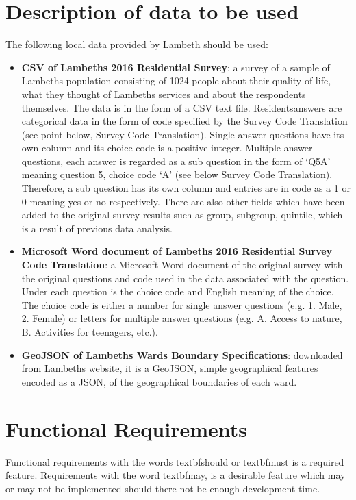 \section{Description of data to be used}
The following local data provided by Lambeth should be used:
\begin{itemize}
  \item \textbf{CSV of Lambeth\textquotesingle s 2016 Residential Survey}: a survey of a sample of Lambeth\textquotesingle s population consisting of 1024 people about their quality of life, what they thought of Lambeth\textquotesingle s services and about the respondents themselves. The data is in the form of a CSV text file. Residents\textquotesingle  answers are categorical data in the form of code specified by the Survey Code Translation (see point below, Survey Code Translation). Single answer questions have its own column and its choice code is a positive integer. Multiple answer questions, each answer is regarded as a sub question in the form of `Q5A' meaning question 5, choice code `A' (see below Survey Code Translation). Therefore, a sub question has its own column and entries are in code as a 1 or 0 meaning yes or no respectively. There are also other fields which have been added to the original survey results such as group, subgroup, quintile, which is a result of previous data analysis.
  \item \textbf{Microsoft Word document of Lambeth\textquotesingle s 2016 Residential Survey Code Translation}: a Microsoft Word document of the original survey with the original questions and code used in the data associated with the question. Under each question is the choice code and English meaning of the choice. The choice code is either a number for single answer questions (e.g. 1. Male, 2. Female) or letters for multiple answer questions (e.g. A. Access to nature, B. Activities for teenagers, etc.).
  \item \textbf{GeoJSON of Lambeth\textquotesingle s Ward\textquotesingle s Boundary Specifications}: downloaded from Lambeth\textquotesingle s website, it is a GeoJSON, simple geographical features encoded as a JSON, of the geographical boundaries of each ward.
\end{itemize}

\section{Functional Requirements}
Functional requirements with the words textbf{should} or textbf{must} is a required feature. Requirements with the word textbf{may}, is a desirable feature which may or may not be implemented should there not be enough development time.


